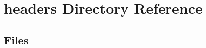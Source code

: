 \section{headers Directory Reference}
\label{dir_7f57b1e41c5acd0e859ae5f3a2b075a9}
\subsection*{Files}
\begin{DoxyCompactItemize}
\end{DoxyCompactItemize}
